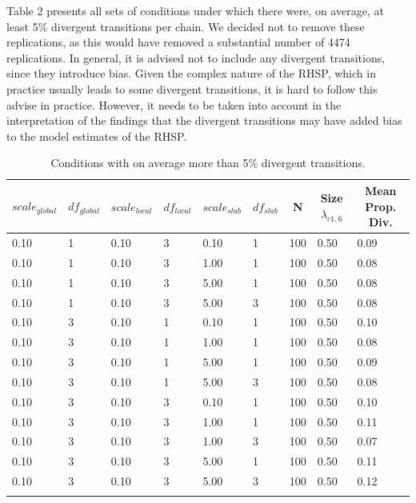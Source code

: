 \documentclass[
  english,
  man, donotrepeattitle,floatsintext]{apa6}
\begin{document}
Table 2 presents all sets of conditions under which there were, on average, at least 5\% divergent transitions per chain. We decided not to remove these replications, as this would have removed a substantial number of 4474 replications. In general, it is advised not to include any divergent transitions, since they introduce bias. Given the complex nature of the RHSP, which in practice usually leads to some divergent transitions, it is hard to follow this advise in practice. However, it needs to be taken into account in the interpretation of the findings that the divergent transitions may have added bias to the model estimates of the RHSP.

\begin{table}[tbp]

\begin{center}
\begin{threeparttable}

\caption{\label{tab:unnamed-chunk-3}Conditions with on average more than 5\% divergent transitions.}

\begin{tabular}{lllllllll}
\toprule
$scale_{global}$ & \multicolumn{1}{c}{$df_{global}$} & \multicolumn{1}{c}{$scale_{local}$} & \multicolumn{1}{c}{$df_{local}$} & \multicolumn{1}{c}{$scale_{slab}$} & \multicolumn{1}{c}{$df_{slab}$} & \multicolumn{1}{c}{N} & \multicolumn{1}{c}{Size $\lambda_{c1 , 6}$} & \multicolumn{1}{c}{Mean Prop. Div.}\\
\midrule
0.10 & 1 & 0.10 & 3 & 0.10 & 1 & 100 & 0.50 & 0.09\\
0.10 & 1 & 0.10 & 3 & 1.00 & 1 & 100 & 0.50 & 0.08\\
0.10 & 1 & 0.10 & 3 & 5.00 & 1 & 100 & 0.50 & 0.08\\
0.10 & 1 & 0.10 & 3 & 5.00 & 3 & 100 & 0.50 & 0.08\\
0.10 & 3 & 0.10 & 1 & 0.10 & 1 & 100 & 0.50 & 0.10\\
0.10 & 3 & 0.10 & 1 & 1.00 & 1 & 100 & 0.50 & 0.08\\
0.10 & 3 & 0.10 & 1 & 5.00 & 1 & 100 & 0.50 & 0.09\\
0.10 & 3 & 0.10 & 1 & 5.00 & 3 & 100 & 0.50 & 0.08\\
0.10 & 3 & 0.10 & 3 & 0.10 & 1 & 100 & 0.50 & 0.10\\
0.10 & 3 & 0.10 & 3 & 1.00 & 1 & 100 & 0.50 & 0.11\\
0.10 & 3 & 0.10 & 3 & 1.00 & 3 & 100 & 0.50 & 0.07\\
0.10 & 3 & 0.10 & 3 & 5.00 & 1 & 100 & 0.50 & 0.11\\
0.10 & 3 & 0.10 & 3 & 5.00 & 3 & 100 & 0.50 & 0.12\\
\bottomrule
\addlinespace
\end{tabular}


\end{threeparttable}
\end{center}
\end{table}
\end{document}

